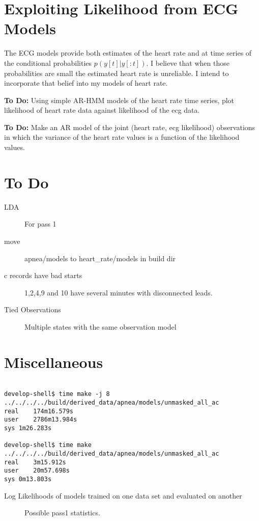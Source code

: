 \documentclass[12pt]{article}
\begin{document}
\section{Exploiting Likelihood from ECG Models}
\label{sec:exploit_likelihood}

The ECG models provide both estimates of the heart rate and at time
series of the conditional probabilities $p(y[t]|y[:t])$.  I believe
that when those probabilities are small the estimated heart rate is
unreliable.  I intend to incorporate that belief into my models of
heart rate.

\textbf{To Do:} Using simple AR-HMM models of the heart rate time
series, plot likelihood of heart rate data against likelihood of the
ecg data.

\textbf{To Do:}  Make an AR model of the joint (heart
rate, ecg likelihood) observations in which the variance of the heart
rate values is a function of the likelihood values.

\section{To Do}
\label{sec:todo}

\begin{description}
\item[LDA] For pass 1
\item[move] apnea/models to heart\_rate/models in build dir
\item[c records have bad starts] 1,2,4,9 and 10 have several minutes
  with disconnected leads.
\item[Tied Observations] Multiple states with the same observation model
\end{description}

\section{Miscellaneous}
\label{sec:misc}
\begin{verbatim}

develop-shell$ time make -j 8 ../../../../build/derived_data/apnea/models/unmasked_all_ac  
real	174m16.579s
user	2786m13.984s
sys	1m26.283s

develop-shell$ time make ../../../../build/derived_data/apnea/models/unmasked_all_ac
real	3m15.912s
user	20m57.698s
sys	0m13.803s

\end{verbatim}

\begin{table}
  \centering
   
  \caption[Log Likelihoods]{Log Likelihoods of models trained on one
    data set and evaluated on another}
  \label{tab:log_likelihoods}
\end{table}

\begin{figure}
  \centering
    \caption{Possible pass1 statistics.}
  \label{fig:statistics}
\end{figure}
\end{document}
